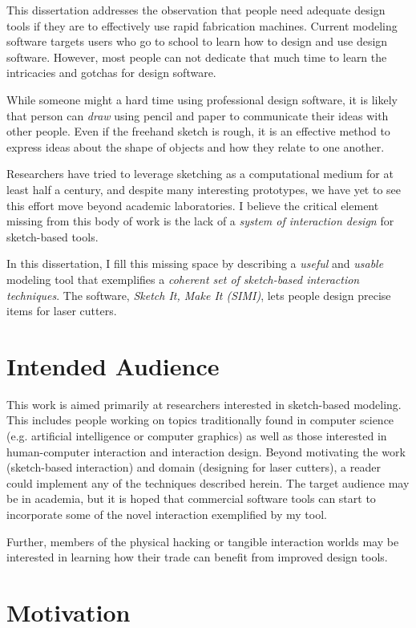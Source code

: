 This dissertation addresses the observation that people need adequate
design tools if they are to effectively use rapid fabrication
machines. Current modeling software targets users who go to school to
learn how to design and use design software. However, most people can
not dedicate that much time to learn the intricacies and gotchas for
design software.

While someone might a hard time using professional design software, it
is likely that person can \textit{draw} using pencil and paper to
communicate their ideas with other people. Even if the freehand sketch
is rough, it is an effective method to express ideas about the shape
of objects and how they relate to one another.

Researchers have tried to leverage sketching as a computational medium
for at least half a century, and despite many interesting prototypes,
we have yet to see this effort move beyond academic laboratories. I
believe the critical element missing from this body of work is the
lack of a \textit{system of interaction design} for sketch-based
tools.

In this dissertation, I fill this missing space by describing a
\textit{useful} and \textit{usable} modeling tool that exemplifies a
\textit{coherent set of sketch-based interaction techniques}. The
software, \textit{Sketch It, Make It (SIMI)}, lets people design
precise items for laser cutters. 

\section{Intended Audience}

This work is aimed primarily at researchers interested in sketch-based
modeling. This includes people working on topics traditionally found
in computer science (e.g. artificial intelligence or computer
graphics) as well as those interested in human-computer interaction
and interaction design. Beyond motivating the work (sketch-based
interaction) and domain (designing for laser cutters), a reader could
implement any of the techniques described herein. The target audience
may be in academia, but it is hoped that commercial software tools can
start to incorporate some of the novel interaction exemplified by my
tool.

Further, members of the physical hacking or tangible interaction
worlds may be interested in learning how their trade can benefit from
improved design tools.

\section{Motivation}

